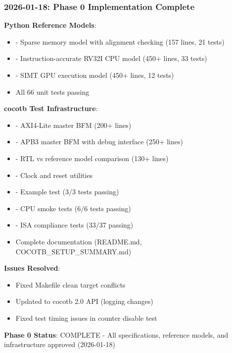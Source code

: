 \subsubsection{\texorpdfstring{2026-01-18: Phase 0 Implementation
Complete \ok{}}{2026-01-18: Phase 0 Implementation Complete }}\label{cr:status:phase-status:2026-01-18-phase-0-implementation-complete-white-check-mark}

\begin{record}

\textbf{Python Reference Models}:

\begin{itemize}
\tightlist
\item
  \ok{}  - Sparse memory model with
  alignment checking (157 lines, 21 tests)
\item
  \ok{}  - Instruction-accurate RV32I CPU
  model (450+ lines, 33 tests)
\item
  \ok{}  - SIMT GPU execution model
  (450+ lines, 12 tests)
\item
  \ok{} All 66 unit tests passing
\end{itemize}

\textbf{cocotb Test Infrastructure}:

\begin{itemize}
\tightlist
\item
  \ok{}  - AXI4-Lite master BFM
  (200+ lines)
\item
  \ok{}  - APB3 master BFM with debug
  interface (250+ lines)
\item
  \ok{}  - RTL vs reference model
  comparison (130+ lines)
\item
  \ok{}  - Clock and reset
  utilities
\item
  \ok{}  - Example test (3/3
  tests passing)
\item
  \ok{}  - CPU smoke tests (6/6 tests
  passing)
\item
  \ok{}  - ISA compliance
  tests (33/37 passing)
\item
  \ok{} Complete documentation (README.md,
  COCOTB\_\allowbreak{}SETUP\_\allowbreak{}SUMMARY.md)
\end{itemize}

\textbf{Issues Resolved}:

\begin{itemize}
\tightlist
\item
  Fixed Makefile clean target conflicts
\item
  Updated to cocotb 2.0 API (logging changes)
\item
  Fixed test timing issues in counter disable test
\end{itemize}

\textbf{Phase 0 Status}: \ok{} COMPLETE - All specifications, reference
models, and infrastructure approved (2026-01-18)

\end{record}

